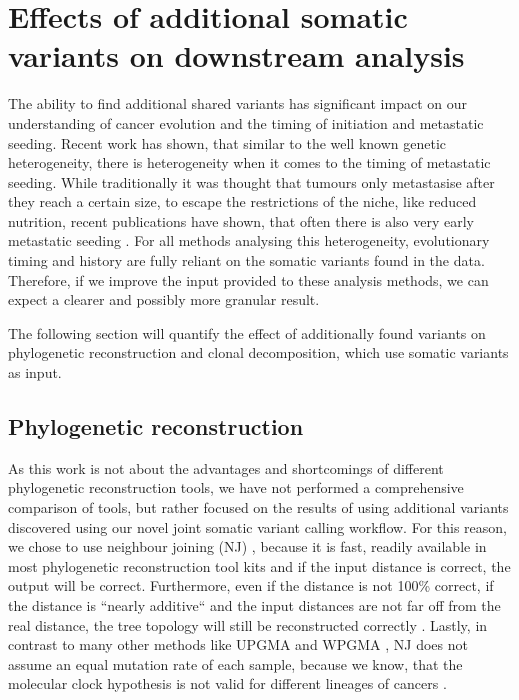 \section[Effects on downstream analysis]{Effects of additional somatic variants on downstream analysis}
\label{variantcalling-sec:downstream}

The ability to find additional shared variants has significant impact on our understanding of cancer evolution and the timing of initiation and metastatic seeding. Recent work has shown, that similar to the well known genetic heterogeneity, there is heterogeneity when it comes to the timing of metastatic seeding. While traditionally it was thought that tumours only metastasise after they reach a certain size, to escape the restrictions of the niche, like reduced nutrition, recent publications have shown, that often there is also very early metastatic seeding \cite{Hu2019}. 
For all methods analysing this heterogeneity, evolutionary timing and history are fully reliant on the somatic variants found in the data. Therefore, if we improve the input provided to these analysis methods, we can expect a clearer and possibly more granular result.

The following section will quantify the effect of additionally found variants on phylogenetic reconstruction and clonal decomposition, which use somatic variants as input.


\subsection[Phylogenetic reconstruction]{Phylogenetic reconstruction}
\label{variantcalling-sec:phylo}
As this work is not about the advantages and shortcomings of different phylogenetic reconstruction tools, we have not performed a comprehensive comparison of tools, but rather focused on the results of using additional variants discovered using our novel joint somatic variant calling workflow.  For this reason, we chose to use neighbour joining (NJ) \cite{Saitou1987}, because it is fast, readily available in most phylogenetic reconstruction tool kits and if the input distance is correct, the output will be correct. Furthermore, even if the distance is not 100\% correct, if the distance is ``nearly additive`` and the input distances are not far off from the real distance, the tree topology will still be reconstructed correctly \cite{Mihaescu2007}. Lastly, in contrast to many other methods like UPGMA and WPGMA \cite{Sokal1958}, NJ does not assume an equal mutation rate of each sample, because we know, that the molecular clock hypothesis \cite{Zuckerkandl1962} is not valid for different lineages of cancers \cite{Shibata2010}.

